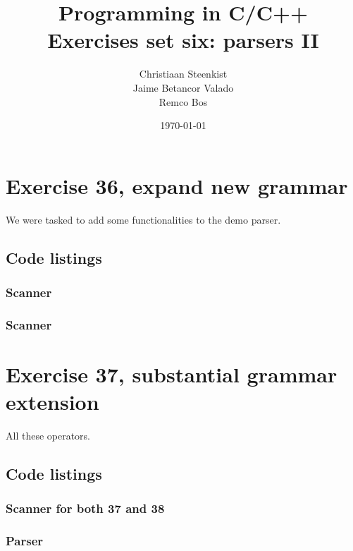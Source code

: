 \documentclass[11pt]{article}
\begin{document}
\title{Programming in C/C++ \\
       Exercises set six: parsers II
}
\date{\today}
\author{Christiaan Steenkist \\
Jaime Betancor Valado \\
Remco Bos \\
}

\maketitle
\section*{Exercise 36, expand new grammar}
We were tasked to add some functionalities to the demo parser.

\subsection*{Code listings}
\subsubsection*{Scanner}


\subsubsection*{Scanner}





\section*{Exercise 37, substantial grammar extension}
All these operators.

\subsection*{Code listings}
\subsubsection*{Scanner for both 37 and 38}


\subsubsection*{Parser}



\end{document}
